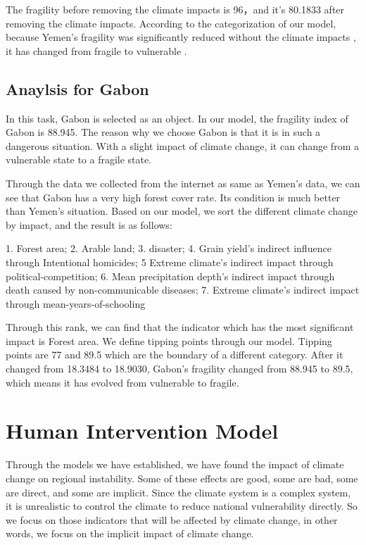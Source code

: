 \documentclass{mcmthesis}
\begin{document}
			The fragility before removing the climate impacts is 96，and it’s 80.1833 after removing the climate impacts. According to the categorization of our model, because Yemen's fragility was significantly reduced without the climate impacts , it has changed from fragile to vulnerable .
			
		\subsection{Anaylsis for Gabon}
		
			In this task, Gabon is selected as an object. In our model, the fragility index of Gabon is 88.945.  The reason why we choose Gabon is that it is in such a dangerous situation. With a slight impact of climate change, it can change from a vulnerable state to a fragile state.
			
			Through the data we collected from the internet as same as Yemen's data, we can see that Gabon has a very high forest cover rate. Its condition is much better than Yemen’s situation. 
			Based on our model, we sort the different climate change by impact, and the result is as follows:
			
			1. Forest area; 2. Arable land; 3. disaster; 4. Grain yield’s indirect influence through Intentional homicides; 5 Extreme climate’s indirect impact through political-competition; 6. Mean precipitation depth’s indirect impact through death caused by non-communicable diseases; 7. Extreme climate’s indirect impact through mean-years-of-schooling
			
			Through this rank, we can find that the indicator which has the most significant impact is Forest area. We define tipping points through our model. Tipping points are 77 and 89.5 which are the boundary of a different category. After it changed from 18.3484 to 18.9030, Gabon’s fragility changed from 88.945 to 89.5, which means it has evolved from vulnerable to fragile.
			
		
	\section{Human Intervention Model}
	
		Through the models we have established, we have found the impact of climate change on regional instability. Some of these effects are good, some are bad, some are direct, and some are implicit. Since the climate system is a complex system, it is unrealistic to control the climate to reduce national vulnerability directly. So we focus on those indicators that will be affected by climate change, in other words, we focus on the implicit impact of climate change. 
		
\end{document}
